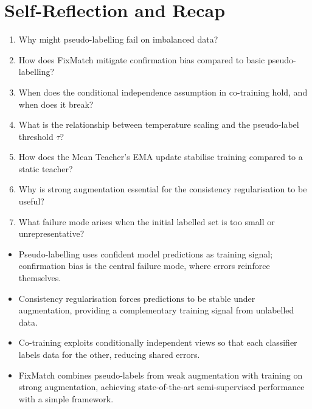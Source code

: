 \section{Self-Reflection and Recap}


\begin{enumerate}
    \item Why might pseudo-labelling fail on imbalanced data?
    \item How does FixMatch mitigate confirmation bias compared to basic pseudo-labelling?
    \item When does the conditional independence assumption in co-training hold, and when does it break?
    \item What is the relationship between temperature scaling and the pseudo-label threshold $\tau$?
    \item How does the Mean Teacher's EMA update stabilise training compared to a static teacher?
    \item Why is strong augmentation essential for the consistency regularisation to be useful?
    \item What failure mode arises when the initial labelled set is too small or unrepresentative?
\end{enumerate}

\vspace{1.5em}


\begin{itemize}
    \item Pseudo-labelling uses confident model predictions as training signal; confirmation bias is the central failure mode, where errors reinforce themselves.
    \item Consistency regularisation forces predictions to be stable under augmentation, providing a complementary training signal from unlabelled data.
    \item Co-training exploits conditionally independent views so that each classifier labels data for the other, reducing shared errors.
    \item FixMatch combines pseudo-labels from weak augmentation with training on strong augmentation, achieving state-of-the-art semi-supervised performance with a simple framework.
\end{itemize}

\vspace{2.5em}


